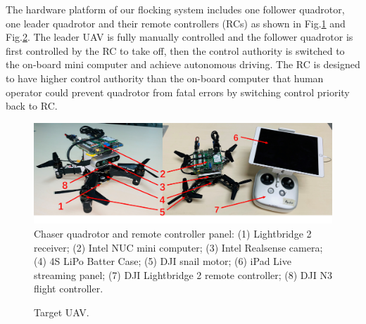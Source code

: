 The hardware platform of our flocking system includes one follower quadrotor, one leader quadrotor and their remote controllers (RCs) as shown in Fig.\ref{fig:quadrotor_controller} and Fig.\ref{fig:target_uav}. The leader UAV is fully manually controlled and the follower quadrotor is first controlled by the RC to take off, then the control authority is switched to the on-board mini computer and achieve autonomous driving. The RC is designed to have higher control authority than the on-board computer that human operator could prevent quadrotor from fatal errors by switching control priority back to RC.

\begin{figure}[ht]
  \centering
  \includegraphics[width=1.0\textwidth]{figure/chapter_4/chaser_intro.png}
  \caption{Chaser quadrotor and remote controller panel: (1) Lightbridge 2 receiver; (2) Intel NUC mini computer; (3) Intel Realsense camera; (4) 4S LiPo Batter Case; (5) DJI snail motor; (6) iPad Live streaming panel; (7) DJI Lightbridge 2 remote controller; (8) DJI N3 flight controller.}
  \label{fig:quadrotor_controller}
\end{figure}

\begin{figure}[htb]
  \centering
  \caption{Target UAV.}\label{fig:target_uav}
\end{figure}

